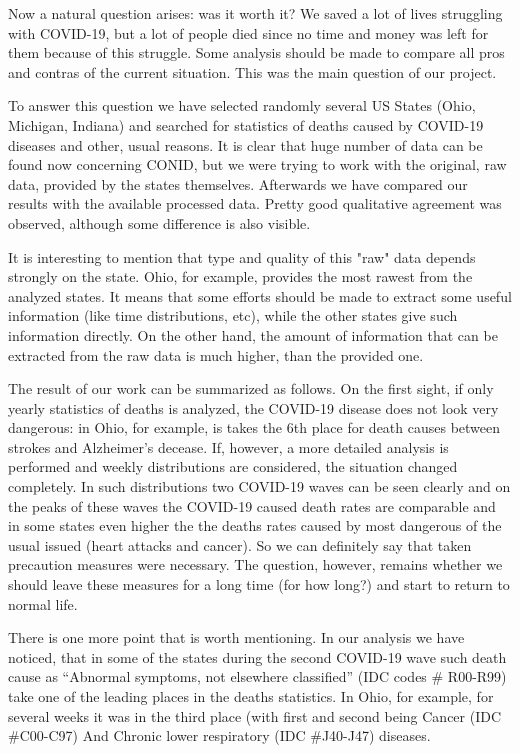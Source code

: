 \documentclass[conference]{IEEEtran}
\begin{document}
Now a natural question arises: was it worth it? We saved a lot of lives struggling with COVID-19, but a lot of people died since no time and money was left for them because of this struggle. Some analysis should be made to compare all pros and contras of the current situation. This was the main question of our project.

To answer this question we have selected randomly several US States (Ohio, Michigan, Indiana) and searched for statistics of deaths caused by COVID-19 diseases and other, usual reasons. It is clear that huge number of data can be found now concerning CONID, but we were trying to work with the original, raw data, provided by the states themselves. Afterwards we have compared our results with the available processed data. Pretty good qualitative agreement  was observed, although some difference is also visible.

It is interesting to mention that type and quality of this "raw" data depends strongly on the state. Ohio, for example, provides the most rawest from the analyzed states. It means that some efforts should be made to extract some useful information (like time distributions, etc), while the other states give such information directly. On the other hand, the amount of information that can be extracted from the raw data is much higher, than the provided one.

The result of our work can be summarized as follows. On the first sight, if only yearly statistics of deaths is analyzed, the COVID-19 disease does not look very dangerous: in Ohio, for example, is takes the 6th place for death causes between strokes and Alzheimer’s decease. If, however, a more detailed analysis is performed and weekly distributions are considered, the situation changed completely. In such distributions two COVID-19 waves can be seen clearly and on the peaks of these waves the COVID-19 caused death rates are comparable and in some states even higher the the deaths rates caused by most dangerous of the usual issued (heart attacks and cancer). So we can definitely say that taken precaution measures were necessary. The question, however, remains whether we should leave these measures for a long time (for how long?) and  start to return to normal life.

There is one more point that is worth mentioning. In our analysis we have noticed, that in some of the states during the second COVID-19 wave such death cause as “Abnormal symptoms, not elsewhere classified” (IDC codes \# R00-R99) take one of the leading places in the deaths statistics. In Ohio, for example, for several weeks it was in the third place (with first and second being Cancer (IDC \#C00-C97) And Chronic lower respiratory (IDC \#J40-J47) diseases.





\end{document}
